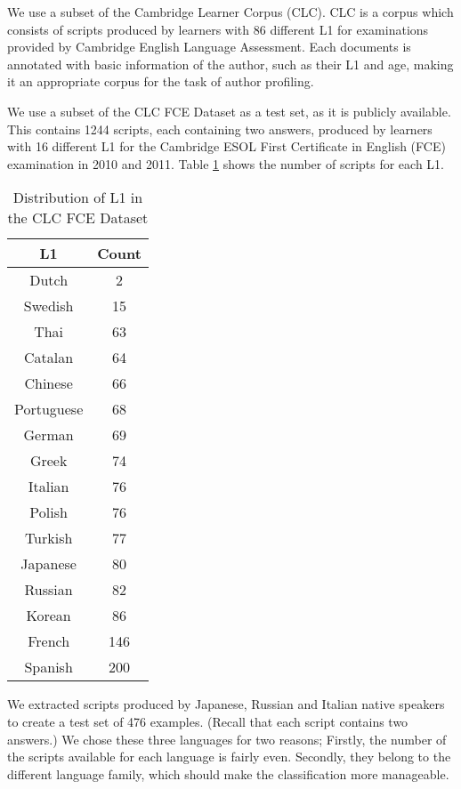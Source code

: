 We use a subset of the Cambridge Learner Corpus \citep{nicholls2003cambridge} (CLC).
CLC is a corpus which consists of scripts produced by learners with 86 different L1 for examinations provided by Cambridge English Language Assessment.
Each documents is annotated with basic information of the author, such as their L1 and age, making it an appropriate corpus for the task of author profiling.

We use a subset of the CLC FCE Dataset\cite{yannakoudakis2011new} as a test set, as it is publicly available.
This contains 1244 scripts, each containing two answers, produced by learners with 16 different L1 for the Cambridge ESOL First Certificate in English (FCE) examination in 2010 and 2011.
Table \ref{tab:l1-fce} shows the number of scripts for each L1.
\begin{table}[]
\centering
\caption{Distribution of L1 in the CLC FCE Dataset}
\label{tab:l1-fce}
\begin{tabular}{|c|c|}
\hline
L1         & Count \\ \hline
Dutch      & 2     \\ \hline
Swedish    & 15    \\ \hline
Thai       & 63    \\ \hline
Catalan    & 64    \\ \hline
Chinese    & 66    \\ \hline
Portuguese & 68    \\ \hline
German     & 69    \\ \hline
Greek      & 74    \\ \hline
Italian    & 76    \\ \hline
Polish     & 76    \\ \hline
Turkish    & 77    \\ \hline
Japanese   & 80    \\ \hline
Russian    & 82    \\ \hline
Korean     & 86    \\ \hline
French     & 146   \\ \hline
Spanish    & 200   \\ \hline
\end{tabular}
\end{table}
We extracted scripts produced by Japanese, Russian and Italian native speakers to create a test set of 476 examples.
(Recall that each script contains two answers.)
We chose these three languages for two reasons;
Firstly, the number of the scripts available for each language is fairly even.
Secondly, they belong to the different language family, which should make the classification more manageable.

